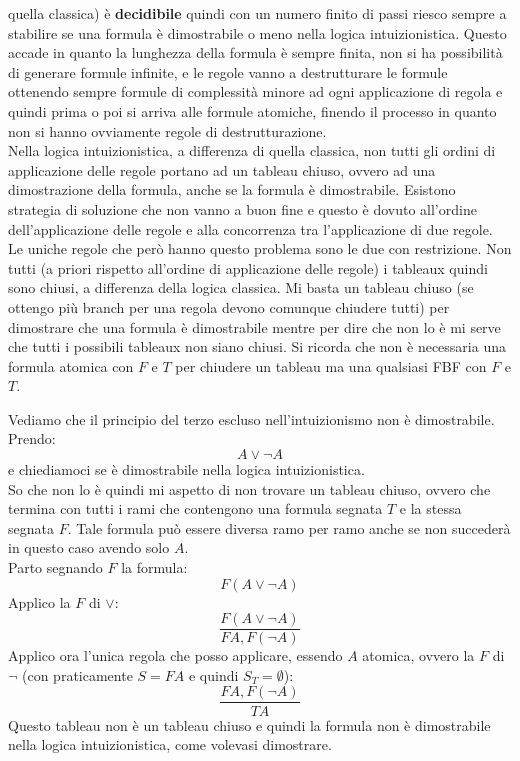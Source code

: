 \documentclass[a4paper,12pt, oneside]{book}
\begin{document}
quella classica) è \textbf{decidibile} quindi con un numero finito di passi
riesco sempre a stabilire se una formula è dimostrabile o meno nella logica
intuizionistica. Questo accade in quanto la lunghezza della formula è sempre
finita, non si ha possibilità di generare formule infinite, e le regole vanno a
destrutturare le formule ottenendo sempre formule di complessità minore ad ogni
applicazione di regola e quindi prima o poi si arriva alle formule atomiche,
finendo il processo in quanto non si hanno ovviamente regole di
destrutturazione.\\ 
Nella logica intuizionistica, a differenza di quella classica,
non tutti gli ordini di applicazione delle regole portano ad
un tableau chiuso, ovvero ad una dimostrazione della formula, anche se la
formula è dimostrabile. Esistono strategia di soluzione che non vanno a buon
fine e questo è dovuto all'ordine dell'applicazione delle regole e alla
concorrenza tra l'applicazione di due regole. Le uniche regole che però hanno
questo problema sono le due con restrizione. Non tutti (a priori rispetto
all'ordine di applicazione delle regole) i tableaux quindi sono
chiusi, a differenza della logica classica. Mi basta un tableau chiuso (se
ottengo più branch per una regola devono comunque chiudere tutti) per
dimostrare che una formula è dimostrabile mentre per dire che non lo è mi serve
che tutti i possibili tableaux non siano chiusi. Si ricorda che non è necessaria
una formula atomica con $F$ e $T$ per chiudere un tableau ma una qualsiasi FBF
con $F$ e $T$.
\begin{esempio}
  Vediamo che il principio del terzo escluso nell'intuizionismo non è
  dimostrabile.\\
  Prendo:
  \[A\lor \neg A\]
  e chiediamoci se è dimostrabile nella logica intuizionistica.\\
  So che non lo è quindi mi aspetto di non trovare un tableau chiuso, ovvero
  che termina con tutti i rami che contengono una formula segnata $T$ e la stessa
  segnata $F$. Tale formula può essere diversa ramo per ramo anche se non
  succederà in questo caso avendo solo $A$.\\
  Parto segnando $F$ la formula:
  \[F(A\lor \neg A)\]
  Applico la $F$ di $\lor$:
  \[\frac{F(A\lor \neg A)}{FA,F(\neg A)}\]
  Applico ora l'unica regola che posso applicare, essendo $A$ atomica, ovvero
  la $F$ di $\neg$ (con praticamente $S=FA$ e quindi $S_T=\emptyset$):
  \[\frac{FA,F(\neg A)}{TA}\]
  Questo tableau non è un tableau chiuso e quindi la formula non è
  dimostrabile nella logica intuizionistica, come volevasi dimostrare.
\end{esempio}
\end{document}
